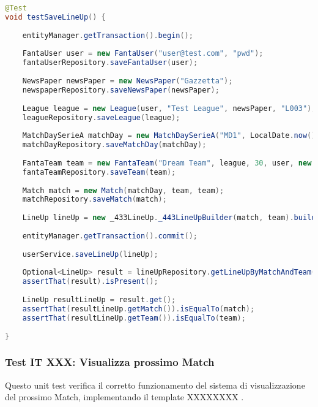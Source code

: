 \begin{lstlisting}[language=Java]
@Test
void testSaveLineUp() {
		
	entityManager.getTransaction().begin();
		
	FantaUser user = new FantaUser("user@test.com", "pwd");
	fantaUserRepository.saveFantaUser(user);
		
	NewsPaper newsPaper = new NewsPaper("Gazzetta");
	newspaperRepository.saveNewsPaper(newsPaper);
		
	League league = new League(user, "Test League", newsPaper, "L003");
	leagueRepository.saveLeague(league);
		
	MatchDaySerieA matchDay = new MatchDaySerieA("MD1", LocalDate.now().plusWeeks(1)); // Monday
	matchDayRepository.saveMatchDay(matchDay);
		
	FantaTeam team = new FantaTeam("Dream Team", league, 30, user, new HashSet<>());
	fantaTeamRepository.saveTeam(team);
		
	Match match = new Match(matchDay, team, team);
	matchRepository.saveMatch(match);
		
	LineUp lineUp = new _433LineUp._443LineUpBuilder(match, team).build();
		
	entityManager.getTransaction().commit();
		
	userService.saveLineUp(lineUp);
		
	Optional<LineUp> result = lineUpRepository.getLineUpByMatchAndTeam(match, team);
	assertThat(result).isPresent();
		
	LineUp resultLineUp = result.get();
	assertThat(resultLineUp.getMatch()).isEqualTo(match);
	assertThat(resultLineUp.getTeam()).isEqualTo(team);
		
}
\end{lstlisting}


\subsubsection{Test IT XXX: Visualizza prossimo Match}

Questo unit test verifica il corretto funzionamento del sistema di visualizzazione del prossimo Match,
implementando il template XXXXXXXX .

